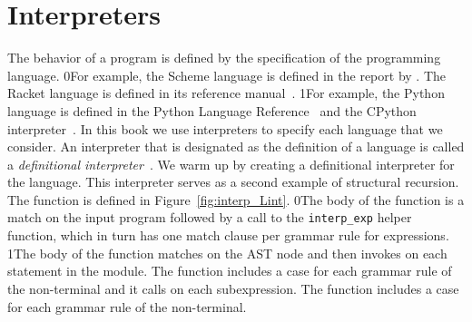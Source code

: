 \documentclass[7x10,nocrop]{TimesAPriori_MIT}%
\def\racketEd{0}
\def\pythonEd{1}
\def\edition{0}
\newcommand{\racket}[1]{{\if\edition\racketEd{#1}\fi}}
\newcommand{\python}[1]{{\if\edition\pythonEd #1\fi}}
\begin{document}
\section{Interpreters}
\label{sec:interp_Lint}

The behavior of a program is defined by the specification of the
programming language.
%
\racket{For example, the Scheme language is defined in the report by
  \cite{SPERBER:2009aa}. The Racket language is defined in its
  reference manual~\citep{plt-tr}.}
%
\python{For example, the Python language is defined in the Python
  Language Reference~\citep{PSF21:python_ref} and the CPython interpreter~\citep{PSF21:cpython}.}
%
In this book we use interpreters to specify each language that we
consider. An interpreter that is designated as the definition of a
language is called a \emph{definitional
  interpreter}~\citep{reynolds72:_def_interp}.
 We warm up by creating a
definitional interpreter for the \LangInt{} language. This interpreter
serves as a second example of structural recursion. The
 function is defined in
Figure~\ref{fig:interp_Lint}.
%
\racket{The body of the function is a match on the input program
  followed by a call to the \lstinline{interp_exp} helper function,
  which in turn has one match clause per grammar rule for \LangInt{}
  expressions.}
%
\python{The body of the function matches on the  AST node
  and then invokes \code{interp\_stmt} on each statement in the
  module.  The \code{interp\_stmt} function includes a case for each
  grammar rule of the \Stmt{} non-terminal and it calls
  \code{interp\_exp} on each subexpression.  The \code{interp\_exp}
  function includes a case for each grammar rule of the \Exp{}
  non-terminal.}
\end{document}
